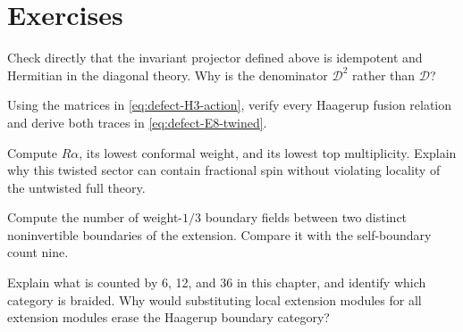 \section{Exercises}

\begin{exercise}\label{ex:defect-projector}
Check directly that the invariant projector defined above is
idempotent and Hermitian in the diagonal theory. Why is the
denominator $\mathcal D^2$ rather than $\mathcal D$?

\par\smallskip{}\par
\end{exercise}

\begin{exercise}\label{ex:defect-twined}
Using the matrices in \eqref{eq:defect-H3-action}, verify every
Haagerup fusion relation and derive both traces in
\eqref{eq:defect-E8-twined}.

\par\smallskip{}\par
\end{exercise}

\begin{exercise}\label{ex:defect-alpha}
Compute $R\alpha$, its lowest conformal weight, and its lowest
top multiplicity. Explain why this twisted sector can contain
fractional spin without violating locality of the untwisted full
theory.

\par\smallskip{}\par
\end{exercise}

\begin{exercise}\label{ex:defect-between}
Compute the number of weight-$1/3$ boundary fields between two
distinct noninvertible boundaries of the extension. Compare it
with the self-boundary count nine.

\par\smallskip{}\par
\end{exercise}

\begin{exercise}\label{ex:defect-categories}
Explain what is counted by 6, 12, and 36 in this chapter, and
identify which category is braided. Why would substituting local
extension modules for all extension modules erase the Haagerup
boundary category?

\par\smallskip{}\par
\end{exercise}
